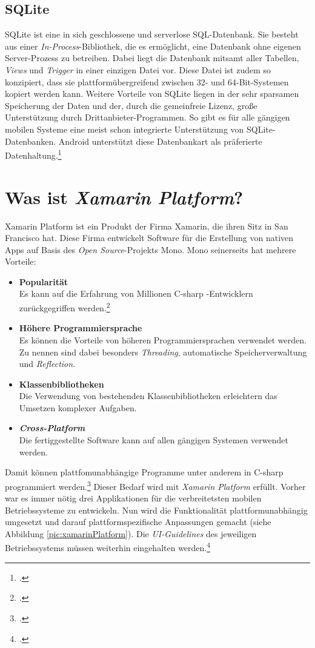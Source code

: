 \subsection{SQLite}
\label{ssec:android-sqlite}
SQLite ist eine in sich geschlossene und serverlose \ac{SQL}-Datenbank. Sie besteht aus einer \textit{In-Process}-Bibliothek, die es ermöglicht, eine Datenbank ohne eigenen Server-Prozess zu betreiben. Dabei liegt die Datenbank mitsamt aller Tabellen, \textit{Views} und \textit{\gls{Trigger}} in einer einzigen Datei vor. Diese Datei ist zudem so konzipiert, dass sie plattformübergreifend zwischen 32- und 64-Bit-Systemen kopiert werden kann. Weitere Vorteile von SQLite liegen in der sehr sparsamen Speicherung der Daten und der, durch die gemeinfreie Lizenz, große Unterstützung durch Drittanbieter-Programmen. So gibt es für alle gängigen mobilen Systeme eine meist schon integrierte Unterstützung von SQLite-Datenbanken. Android unterstützt diese Datenbankart als präferierte Datenhaltung.\footcite[S. 226f.]{Android-BeckerPant}
\section{Was ist \textit{Xamarin Platform}?}
\label{sec:defintion-xamarin}
Xamarin Platform ist ein Produkt der Firma Xamarin, die ihren Sitz in San Francisco hat. Diese Firma entwickelt Software für die Erstellung von nativen Apps auf Basis des \textit{Open Source}-Projekts \gls{Mono}. Mono seinerseits hat mehrere Vorteile:
\begin{itemize}
\item \textbf{Popularität}\\Es kann auf die Erfahrung von Millionen \gls{C-sharp} -Entwicklern zurückgegriffen werden.\footcite{Xamarin-Platform}
\item \textbf{Höhere Programmiersprache} \\Es können die Vorteile von höheren Programmiersprachen verwendet werden. Zu nennen sind dabei besonders \textit{Threading}, automatische Speicherverwaltung und \textit{\gls{Reflection}}.
\item \textbf{Klassenbibliotheken}\\Die Verwendung von bestehenden Klassenbibliotheken erleichtern das Umsetzen komplexer Aufgaben.
\item \textbf{\textit{Cross-Platform}}\\Die fertiggestellte Software kann auf allen gängigen Systemen verwendet werden.
\end{itemize}
Damit können plattfomunabhängige Programme unter anderem in \gls{C-sharp} programmiert werden.\footcite{Xamarin-Multiplatform} Dieser Bedarf wird mit \textit{Xamarin Platform} erfüllt. Vorher war es immer nötig drei Applikationen für die verbreitetsten mobilen Betriebssysteme zu entwickeln. Nun wird die Funktionalität plattformunabhängig umgesetzt und darauf plattformspezifische Anpassungen gemacht (siehe Abbildung \ref{pic:xamarinPlatform}). Die \textit{UI-Guidelines} des jeweiligen Betriebssystems müssen weiterhin eingehalten werden.\footcite{Xamarin-Platform}
